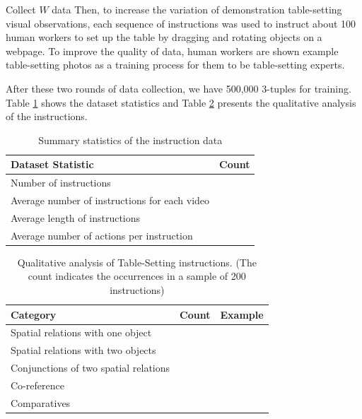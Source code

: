 \documentclass[conference]{IEEEtran}
\begin{document}
\color{red} Collect $W$ data \color{black} Then, to increase the variation of demonstration table-setting visual observations, each sequence of instructions was used to instruct about 100 human workers to set up the table by dragging and rotating objects on a webpage. To improve the quality of data, human workers are shown example table-setting photos as a training process for them to be table-setting experts.

After these two rounds of data collection, we have 500,000 3-tuples for training. Table \ref{data-stats} shows the dataset statistics and Table \ref{data-analysis} presents the qualitative analysis of the instructions.


\begin{table}[]
\caption{Summary statistics of the instruction data}\label{data-stats}
\begin{center}
\begin{tabular}{@{}|l|l|@{}}
\toprule
Dataset Statistic                             & Count \\ \midrule
Number of instructions                        &       \\
Average number of instructions for each video &       \\
Average length of instructions                &       \\
Average number of actions per instruction     &       \\ \bottomrule
\end{tabular}
\end{center}
\end{table}


\begin{table}[]
\caption{Qualitative analysis of Table-Setting instructions. \small{(The count indicates the occurrences in a sample of 200 instructions)}}\label{data-analysis}
\begin{center}
\begin{tabular}{@{}|l|l|l|@{}}
\toprule
Category                              & Count & Example \\ \midrule
Spatial relations with one object     &       &         \\
Spatial relations with two objects    &       &         \\
Conjunctions of two spatial relations &       &         \\
Co-reference                          &       &         \\
Comparatives                          &       &         \\ \bottomrule
\end{tabular}
\end{center}
\end{table}
\end{document}
